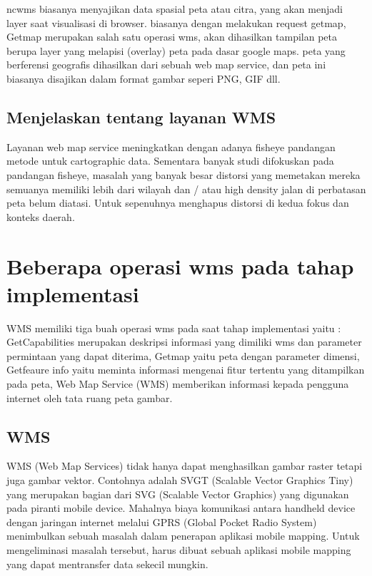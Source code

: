 ncwms biasanya menyajikan data spasial peta atau citra, yang akan menjadi layer saat visualisasi di browser.
biasanya dengan melakukan request getmap, Getmap merupakan salah satu operasi wms, akan dihasilkan tampilan peta berupa layer yang
melapisi (overlay) peta pada dasar google maps. peta yang berferensi geografis dihasilkan dari sebuah web map service, dan peta ini
biasanya disajikan dalam format gambar seperi PNG, GIF dll.

\subsection{Menjelaskan tentang layanan WMS}
Layanan web map service meningkatkan dengan  adanya fisheye pandangan metode untuk cartographic data. Sementara banyak studi difokuskan
pada pandangan fisheye, masalah yang banyak besar distorsi yang memetakan mereka semuanya memiliki lebih dari wilayah dan / atau high
density jalan di perbatasan peta belum diatasi. Untuk sepenuhnya menghapus distorsi di kedua fokus dan konteks daerah.

\section{Beberapa operasi wms pada tahap implementasi}
WMS memiliki tiga buah operasi wms pada saat tahap implementasi yaitu : GetCapabilities merupakan deskripsi informasi yang dimiliki wms
dan parameter permintaan yang dapat diterima, Getmap yaitu peta dengan parameter dimensi, Getfeaure info yaitu meminta informasi 
mengenai fitur tertentu yang ditampilkan pada peta, Web Map Service (WMS) memberikan informasi kepada pengguna internet oleh tata ruang peta gambar.

\subsection{WMS}
WMS (Web Map Services) tidak hanya dapat menghasilkan gambar raster tetapi juga gambar vektor. Contohnya  adalah SVGT (Scalable Vector
Graphics Tiny) yang merupakan bagian dari SVG (Scalable Vector Graphics) yang digunakan pada piranti mobile device. Mahalnya biaya
komunikasi antara handheld device dengan jaringan internet melalui GPRS (Global Pocket Radio System) menimbulkan sebuah masalah dalam
penerapan aplikasi mobile mapping. Untuk mengeliminasi masalah tersebut, harus dibuat sebuah aplikasi mobile mapping yang dapat mentransfer data sekecil mungkin.

